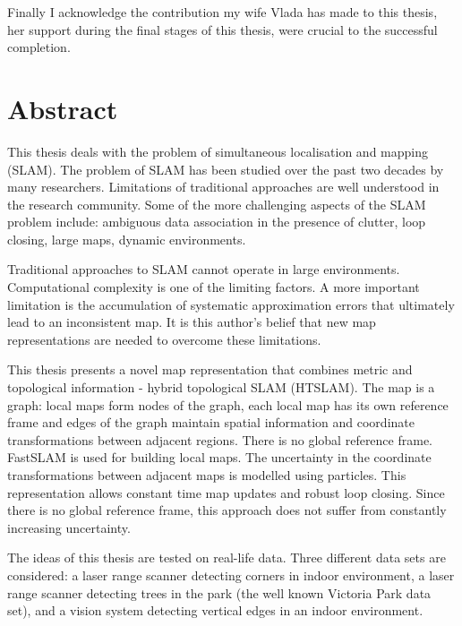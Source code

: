 \documentclass[11pt,onecolum,a4paper,oneside]{book}
\begin{document}
Finally I acknowledge the contribution my wife Vlada has made to this
thesis, her support during the final stages of this thesis, were
crucial to the successful completion.







\chapter*{Abstract}  %

This thesis deals with the problem of simultaneous localisation and
mapping (SLAM). The problem of SLAM has been studied over the past two
decades by many researchers. Limitations of traditional approaches are
well understood in the research community. Some of the more
challenging aspects of the SLAM problem include: ambiguous data
association in the presence of clutter, loop closing, large maps,
dynamic environments.

Traditional approaches to SLAM cannot operate in large
environments. Computational complexity is one of the limiting
factors. A more important limitation is the accumulation of systematic
approximation errors that ultimately lead to an inconsistent map. It is
this author's belief that new map representations are needed to
overcome these limitations.

This thesis presents a novel map representation that combines metric
and topological information - hybrid topological SLAM (HTSLAM). The
map is a graph: local maps form nodes of the graph, each local map has
its own reference frame and edges of the graph maintain spatial
information and coordinate transformations between adjacent
regions. There is no global reference frame. FastSLAM is used for
building local maps. The uncertainty in the coordinate transformations
between adjacent maps is modelled using particles. This representation
allows constant time map updates and robust loop closing. Since there
is no global reference frame, this approach does not suffer from
constantly increasing uncertainty.

The ideas of this thesis are tested on real-life data. Three different
data sets are considered: a laser range scanner detecting corners in
indoor environment, a laser range scanner detecting trees in the park
(the well known Victoria Park data set), and a vision system detecting
vertical edges in an indoor environment.
\end{document}
